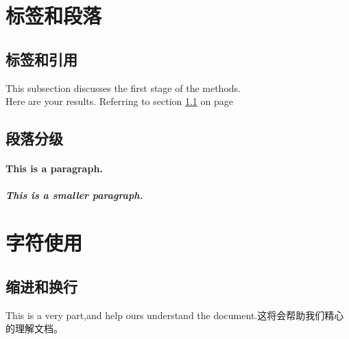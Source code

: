 \documentclass[a4paper,12pt]{article}
\begin{document}
    \section{标签和段落}        
     
        \subsection{标签和引用}%

        \label{sec1}This subsection discusses the first stage of the methods.
        \\ Here are your results. Referring to section \ref{sec1} on page \pageref{sec1}
        
        \subsection{段落分级}
        
        \paragraph{\indent This is a paragraph.} %
            \subparagraph{This is a smaller paragraph.}
    
    
    \section{字符使用} 
    
        \subsection{缩进和换行}%
        This is a very part,and help ours understand the document.这将会帮助我们精心的理解文档。  
        \\  %

        \vspace{1cm} %

\end{document}
